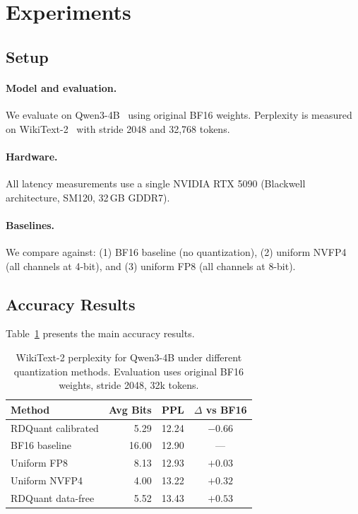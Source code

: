 \documentclass{article}
\begin{document}
\section{Experiments}
\label{sec:experiments}

\subsection{Setup}
\label{sec:setup}

\paragraph{Model and evaluation.}
We evaluate on Qwen3-4B~\cite{yang2024qwen2} using original BF16 weights.
Perplexity is measured on WikiText-2~\cite{merity2016wikitext} with stride 2048 and 32{,}768 tokens.

\paragraph{Hardware.}
All latency measurements use a single NVIDIA RTX 5090 (Blackwell architecture, SM120, 32\,GB GDDR7).

\paragraph{Baselines.}
We compare against: (1) BF16 baseline (no quantization), (2) uniform NVFP4 (all channels at 4-bit), and (3) uniform FP8 (all channels at 8-bit).

\subsection{Accuracy Results}
\label{sec:accuracy}

Table~\ref{tab:accuracy} presents the main accuracy results.

\begin{table}[t]
\centering
\caption{WikiText-2 perplexity for Qwen3-4B under different quantization methods. Evaluation uses original BF16 weights, stride 2048, 32k tokens.}
\label{tab:accuracy}
\begin{tabular}{lrrc}
\toprule
\textbf{Method} & \textbf{Avg Bits} & \textbf{PPL} & \textbf{$\Delta$ vs BF16} \\
\midrule
RDQuant calibrated & 5.29 & 12.24 & $-0.66$ \\
BF16 baseline & 16.00 & 12.90 & --- \\
Uniform FP8 & 8.13 & 12.93 & $+0.03$ \\
Uniform NVFP4 & 4.00 & 13.22 & $+0.32$ \\
RDQuant data-free & 5.52 & 13.43 & $+0.53$ \\
\bottomrule
\end{tabular}
\end{table}
\end{document}
